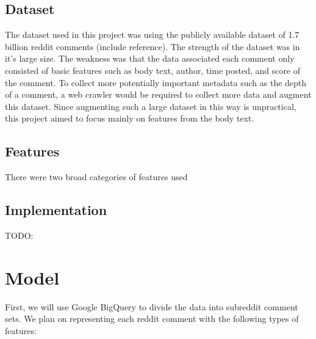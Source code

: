 \documentclass[11pt, twocolumn]{article}
\begin{document}
	\subsection{Dataset}
	The dataset used in this project was using the publicly available dataset of 1.7 billion reddit comments (include reference). The strength of the dataset was in it's large size. The weakness was that the data associated each comment only consisted of basic features such as body text, author, time posted, and score of the comment. To collect more potentially important metadata such as the depth of a comment, a web crawler would be required to collect more data and augment this dataset. Since augmenting such a large dataset in this way is unpractical, this project aimed to focus mainly on features from the body text.
	
	\subsection{Features}
	There were two broad categories of features used
	

	\subsection{Implementation}
	TODO:

\section{Model}
First, we will use Google BigQuery to divide the data into subreddit comment sets. We plan on representing each reddit comment with the following types of features:




\end{document}
